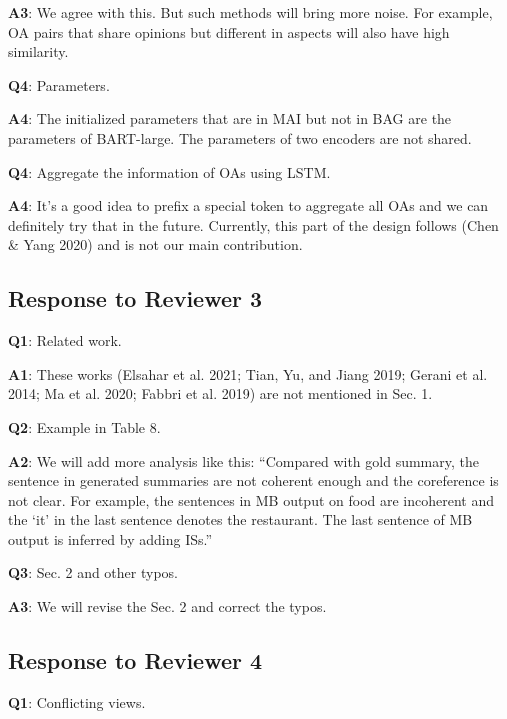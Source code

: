 \documentclass[letterpaper]{article} %
\begin{document}
\noindent 
\textbf{A3}: We agree with this. But such methods will bring more noise. For example, OA pairs
that share opinions but different in aspects will also have high similarity.

\noindent
\textbf{Q4}: Parameters.

\noindent 
\textbf{A4}: The initialized parameters that are in MAI but not in BAG are the parameters 
of BART-large. The parameters of two encoders are not shared.

\noindent
\textbf{Q4}: Aggregate the information of OAs using LSTM.

\noindent 
\textbf{A4}: It's a good idea to prefix a special token to aggregate all OAs 
and we can definitely try that in the future.
Currently, this part of the design follows (Chen \& Yang 2020) and is not our main contribution.

\subsection*{Response to Reviewer 3}
\textbf{Q1}: Related work.

\noindent 
\textbf{A1}: These works (Elsahar et al. 2021; Tian, Yu, and Jiang 2019; Gerani et al. 2014; Ma et al. 2020; Fabbri et al. 2019) are not mentioned in Sec. 1. 

\noindent
\textbf{Q2}: Example in Table 8.

\noindent 
\textbf{A2}: We will add more analysis like this:
``Compared with gold summary, the sentence in generated summaries are not coherent enough 
and the coreference is not clear. For example, the sentences in MB output 
on food are incoherent and the `it' in the last sentence denotes the restaurant. 
The last sentence of MB output is inferred by adding ISs.''

\noindent
\textbf{Q3}: Sec. 2 and other typos.

\noindent 
\textbf{A3}: We will revise the Sec. 2 
and correct the typos.

\subsection*{Response to Reviewer 4}


%
%
\noindent
\textbf{Q1}: Conflicting views.
\end{document}
